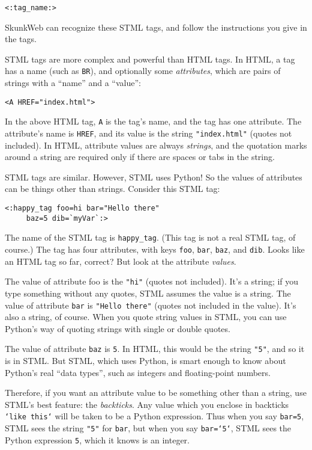 \documentclass{manual}
\begin{document}
\begin{verbatim}
<:tag_name:>
\end{verbatim}


SkunkWeb can recognize these STML tags, and follow the instructions
you give in the tags.

STML tags are more complex and powerful than HTML tags. 
In HTML, a tag has a name (such as \texttt{BR}), 
and optionally some \emph{attributes}, which are pairs 
of strings with a ``name'' and a ``value'':

\begin{verbatim}
<A HREF="index.html">
\end{verbatim}


In the above HTML tag, \texttt{A} is the tag's name, 
and the tag has one attribute. The attribute's name is 
\texttt{HREF}, and its value is the string \texttt{"index.html"} 
(quotes not included). In HTML, attribute values are always 
\emph{strings}, and the quotation marks around a string
are required only if there are spaces or tabs in the string.

STML tags are similar. However, STML uses Python! 
So the values of attributes can be things other than strings. 
Consider this STML tag:

\begin{verbatim}
<:happy_tag foo=hi bar="Hello there" 
     baz=5 dib=`myVar`:>
\end{verbatim}

The name of the STML tag is \texttt{happy_tag}. 
(This tag is not a real STML tag, of course.) 
The tag has four attributes, with keys \texttt{foo}, 
\texttt{bar}, \texttt{baz}, and \texttt{dib}. 
Looks like an HTML tag so far, correct? 
But look at the attribute \emph{values}.

The value of attribute foo is the \texttt{"hi"} 
(quotes not included). It's a string; if you type something 
without any quotes, STML assumes the value is a string.
The value of attribute \texttt{bar} is \texttt{"Hello there"} 
(quotes not included in the value). It's also a string, 
of course. When you quote string values in STML, 
you can use Python's way of quoting strings with single 
or double quotes.

The value of attribute \texttt{baz} is \texttt{5}. 
In HTML, this would be the string \texttt{"5"}, and so it 
is in STML. But STML, which uses Python, is smart enough 
to know about Python's real ``data types'', such as integers 
and floating-point numbers.

Therefore, if you want an attribute value to be 
something other than a string, use STML's best feature: 
the \emph{backticks}. Any value which you enclose in backticks 
\texttt{`like this`} will be taken to be a Python expression. 
Thus when you say \texttt{bar=5}, STML sees the string \texttt{"5"} 
for \texttt{bar}, but when you say \texttt{bar=`5`}, STML sees 
the Python expression \texttt{5}, which it knows is an integer.
\end{document}
